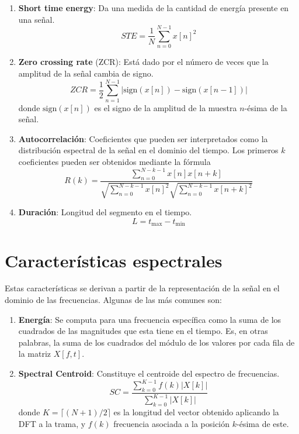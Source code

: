 \begin{enumerate}
    \item \textbf{Short time energy}: Da una medida de la cantidad de energía presente en una señal.
    \[
        STE = \frac{1}{N}\sum_{n=0}^{N-1}{x[n]^2}
    \]
    \item \textbf{Zero crossing rate} (ZCR): Está dado por el número de veces que la amplitud de la señal cambia de signo.
    \[
        ZCR = \frac{1}{2}\sum_{n=1}^{N-1}{|\text{sign}(x[n]) - \text{sign}(x[n-1])|}
    \]
    donde $\text{sign}(x[n])$ es el signo de la amplitud de la muestra $n$-ésima de la señal.
    \item \textbf{Autocorrelación}: Coeficientes que pueden ser interpretados como la distribución espectral de la señal en el dominio del tiempo.
    Los primeros $k$ coeficientes pueden ser obtenidos mediante la fórmula
    \[
        R(k) = \frac{\sum_{n=0}^{N-k-1}{x[n]x[n+k]}}{\sqrt{\sum_{n=0}^{N-k-1}{x[n]^2}}\sqrt{\sum_{n=0}^{N-k-1}{x[n+k]^2}}}
    \]
    \item \textbf{Duración}: Longitud del segmento en el tiempo.
    \[
        L = t_{\max} - t_{\min}
    \]
\end{enumerate}

\section{Características espectrales}\label{sec:característicasEspectrales}

Estas características se derivan a partir de la representación de la señal en el dominio de las frecuencias.
Algunas de las más comunes son:

\begin{enumerate}
    \item \textbf{Energía}: Se computa para una frecuencia específica como la suma de los cuadrados de las magnitudes que esta tiene en el tiempo.
    Es, en otras palabras, la suma de los cuadrados del módulo de los valores por cada fila de la matriz $X[f,t]$.
    \item \textbf{Spectral Centroid}: Constituye el centroide del espectro de frecuencias.
    \[
        SC = \frac{\sum_{k=0}^{K-1}{f(k)|X[k]|}}{\sum_{k=0}^{K-1}{|X[k]|}}
    \]
    donde $K = \lceil (N+1)/2 \rceil$ es la longitud del vector obtenido aplicando la DFT a la trama, y $f(k)$ frecuencia asociada a la posición $k$-ésima de este.
\end{enumerate}